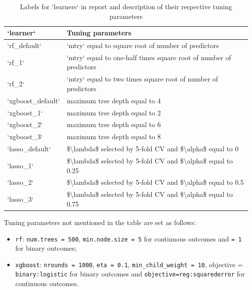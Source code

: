 \documentclass[]{article}
\providecommand{\tightlist}{%
  \setlength{\itemsep}{0pt}\setlength{\parskip}{0pt}}
\begin{document}
\begin{table}

\caption{\label{tab:learners}Labels for `learners` in report and description of their respective tuning parameters}
\centering
\begin{tabular}[t]{l|l}
\hline
`learner` & Tuning parameters\\
\hline
`rf\_default` & `mtry` equal to square root of number of predictors\\
\hline
`rf\_1` & `mtry` equal to one-half times square root of number of predictors\\
\hline
`rf\_2` & `mtry` equal to two times square root of number of predictors\\
\hline
`xgboost\_default` & maximum tree depth equal to 4\\
\hline
`xgboost\_1` & maximum tree depth equal to 2\\
\hline
`xgboost\_2` & maximum tree depth equal to 6\\
\hline
`xgboost\_3` & maximum tree depth equal to 8\\
\hline
`lasso\_default` & \$\textbackslash{}lambda\$ selected by 5-fold CV and \$\textbackslash{}alpha\$ equal to 0\\
\hline
`lasso\_1` & \$\textbackslash{}lambda\$ selected by 5-fold CV and \$\textbackslash{}alpha\$ equal to 0.25\\
\hline
`lasso\_2` & \$\textbackslash{}lambda\$ selected by 5-fold CV and \$\textbackslash{}alpha\$ equal to 0.5\\
\hline
`lasso\_3` & \$\textbackslash{}lambda\$ selected by 5-fold CV and \$\textbackslash{}alpha\$ equal to 0.75\\
\hline
\end{tabular}
\end{table}

Tuning parameters not mentioned in the table are set as follows:

\begin{itemize}
\tightlist
\item
  \texttt{rf}: \texttt{num.trees\ =\ 500}, \texttt{min.node.size\ =\ 5}
  for continuous outcomes and \texttt{=\ 1} for binary outcomes;
\item
  \texttt{xgboost}: \texttt{nrounds\ =\ 1000}, \texttt{eta\ =\ 0.1},
  \texttt{min\_child\_weight\ =\ 10}, objective =
  \texttt{binary:logistic} for binary outcomes and
  \texttt{objective=reg:squarederror} for continuous outcomes.
\end{itemize}
\end{document}
